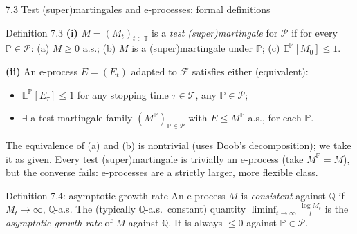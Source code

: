 \documentclass[aspectratio=169,10pt]{beamer}
\begin{document}
\begin{frame}{7.3 Test (super)martingales and e-processes: formal definitions}

\begin{block}{Definition 7.3}
\textbf{(i)} $M=(M_t)_{t\in\mathbb T}$ is a \emph{test (super)martingale} for $\mathcal P$ if for every
$\mathbb P \in \mathcal P$: (a) $M \ge 0$ a.s.; (b) $M$ is a (super)martingale under $\mathbb P$; (c)
$\mathbb E^{\mathbb P}[M_0] \le 1$.

\textbf{(ii)} An e-process $E=(E_t)$ adapted to $\mathcal F$ satisfies either (equivalent):
\begin{itemize}
\item[(a)] $\mathbb E^{\mathbb P}[E_\tau] \le 1$ for any stopping time $\tau \in \mathcal T$, any $\mathbb P \in \mathcal P$;
\item[(b)] $\exists$ a test martingale family $(M^{\mathbb P})_{\mathbb P\in\mathcal P}$ with $E \le M^{\mathbb P}$
a.s., for each $\mathbb P$.
\end{itemize}
\end{block}

The equivalence of (a) and (b) is nontrivial (uses Doob's decomposition); we take it as given. Every test
(super)martingale is trivially an e-process (take $M^{\mathbb P}=M$), but the converse fails: e-processes are a
strictly larger, more flexible class.

\begin{block}{Definition 7.4: asymptotic growth rate}
An e-process $M$ is \emph{consistent} against $\mathbb Q$ if $M_t \to \infty$, $\mathbb Q$-a.s. The (typically
$\mathbb Q$-a.s.\ constant) quantity $\liminf_{t\to\infty} \frac{\log M_t}{t}$ is the \emph{asymptotic growth rate}
of $M$ against $\mathbb Q$. It is always $\le 0$ against $\mathbb{P} \in \mathcal P$.
\end{block}

\end{frame}
\end{document}
